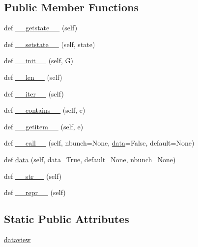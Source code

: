 \subsection*{Public Member Functions}
\begin{DoxyCompactItemize}
\item 
def \hyperlink{classnetworkx_1_1classes_1_1reportviews_1_1OutEdgeView_a11f52245cf08338dd8b72a07073fd4c6}{\+\_\+\+\_\+getstate\+\_\+\+\_\+} (self)
\item 
def \hyperlink{classnetworkx_1_1classes_1_1reportviews_1_1OutEdgeView_a9ae14746d6337569d58fa0e26be4f2d2}{\+\_\+\+\_\+setstate\+\_\+\+\_\+} (self, state)
\item 
def \hyperlink{classnetworkx_1_1classes_1_1reportviews_1_1OutEdgeView_ada395fcd3c5fba981c5def4fcc49b2fa}{\+\_\+\+\_\+init\+\_\+\+\_\+} (self, G)
\item 
def \hyperlink{classnetworkx_1_1classes_1_1reportviews_1_1OutEdgeView_a93d5c73234f169ac44679f5966e076fb}{\+\_\+\+\_\+len\+\_\+\+\_\+} (self)
\item 
def \hyperlink{classnetworkx_1_1classes_1_1reportviews_1_1OutEdgeView_a452dd4ce8ee86e8cad7d773e5241a6e0}{\+\_\+\+\_\+iter\+\_\+\+\_\+} (self)
\item 
def \hyperlink{classnetworkx_1_1classes_1_1reportviews_1_1OutEdgeView_a1a492d5523b253a81a54b7e788bca03e}{\+\_\+\+\_\+contains\+\_\+\+\_\+} (self, e)
\item 
def \hyperlink{classnetworkx_1_1classes_1_1reportviews_1_1OutEdgeView_a2e77b803c900188ff1a3b6336b603ca2}{\+\_\+\+\_\+getitem\+\_\+\+\_\+} (self, e)
\item 
def \hyperlink{classnetworkx_1_1classes_1_1reportviews_1_1OutEdgeView_a49d08b40f964e1180cbbd54e719324b6}{\+\_\+\+\_\+call\+\_\+\+\_\+} (self, nbunch=None, \hyperlink{classnetworkx_1_1classes_1_1reportviews_1_1OutEdgeView_a68182d93c51da856a8d7f7bd411c314c}{data}=False, default=None)
\item 
def \hyperlink{classnetworkx_1_1classes_1_1reportviews_1_1OutEdgeView_a68182d93c51da856a8d7f7bd411c314c}{data} (self, data=True, default=None, nbunch=None)
\item 
def \hyperlink{classnetworkx_1_1classes_1_1reportviews_1_1OutEdgeView_a8c69290e9719e470b8008e8c42707d9f}{\+\_\+\+\_\+str\+\_\+\+\_\+} (self)
\item 
def \hyperlink{classnetworkx_1_1classes_1_1reportviews_1_1OutEdgeView_a2026476cc6b77b65b5fab9961ec45c6b}{\+\_\+\+\_\+repr\+\_\+\+\_\+} (self)
\end{DoxyCompactItemize}
\subsection*{Static Public Attributes}
\begin{DoxyCompactItemize}
\item 
\hyperlink{classnetworkx_1_1classes_1_1reportviews_1_1OutEdgeView_a14b81ea877724ba08f90ee82b469de7f}{dataview}
\end{DoxyCompactItemize}


